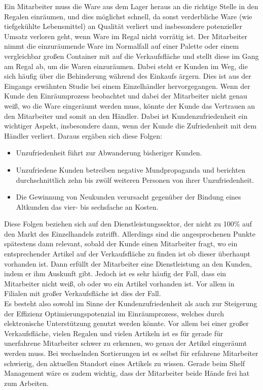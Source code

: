 Ein Mitarbeiter muss die Ware aus dem Lager heraus an die richtige Stelle in den Regalen einräumen, und dies möglichst schnell, da sonst verderbliche Ware (wie \zB tiefgekühlte Lebensmittel) an Qualität verliert und insbesondere potenzieller Umsatz verloren geht, wenn Ware im Regal nicht vorrätig ist. Der Mitarbeiter nimmt die einzuräumende Ware im Normalfall auf einer Palette oder einem vergleichbar großen Container mit auf die Verkaufsfläche und stellt diese im Gang am Regal ab, um die Waren einzuräumen. Dabei steht er Kunden im Weg, die sich häufig über die Behinderung während des Einkaufs ärgern. Dies ist aus der Eingangs erwähnten Studie bei einem Einzelhändler hervorgegangen. Wenn der Kunde den Einräumprozess beobachtet und dabei der Mitarbeiter nicht genau weiß, wo die Ware eingeräumt werden muss, könnte der Kunde das Vertrauen an den Mitarbeiter und somit an den Händler. Dabei ist Kundenzufriedenheit ein wichtiger Aspekt, insbesondere dann, wenn der Kunde die Zufriedenheit mit dem Händler verliert. Daraus ergäben sich diese Folgen:
\begin{itemize}
	\item Unzufriedenheit führt zur Abwanderung bisheriger Kunden.
	\item Unzufriedene Kunden betreiben negative Mundpropaganda und berichten durchschnittlich zehn bis zwölf weiteren Personen von ihrer Unzufriedenheit.
	\item Die Gewinnung von Neukunden verursacht gegenüber der Bindung eines Altkunden das vier- bis sechsfache an Kosten.
\end{itemize}
Diese Folgen beziehen sich auf den Dienstleistungssektor, der nicht zu 100\% auf den Markt des Einzelhandels zutrifft. Allerdings sind die angesprochenen Punkte spätestens dann relevant, sobald der Kunde einen Mitarbeiter fragt, wo ein entsprechender Artikel auf der Verkaufsfläche zu finden ist \bzw ob dieser überhaupt vorhanden ist. Dann erfüllt der Mitarbeiter eine Dienstleistung an den Kunden, indem er ihm Auskunft gibt. Jedoch ist es sehr häufig der Fall, dass ein Mitarbeiter nicht weiß, ob oder wo ein Artikel vorhanden ist. Vor allem in Filialen mit großer Verkaufsfläche ist dies der Fall.\\

Es besteht also sowohl im Sinne der Kundenzufriedenheit als auch zur Steigerung der Effizienz Optimierungspotenzial im Einräumprozess, welches durch elektronische Unterstützung genutzt werden könnte. Vor allem bei einer großer Verkaufsfläche, vielen Regalen und vielen Artikeln ist es für gerade für unerfahrene Mitarbeiter schwer zu erkennen, wo genau der Artikel eingeräumt werden muss. Bei wechselnden Sortierungen ist es selbst für erfahrene Mitarbeiter schwierig, den aktuellen Standort eines Artikels zu wissen. Gerade beim Shelf Management wäre es zudem wichtig, dass der Mitarbeiter beide Hände frei hat zum Arbeiten.

